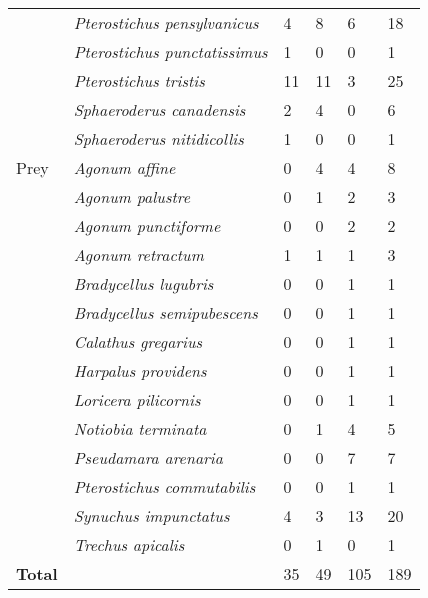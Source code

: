 \begin{table}[h]
\begin{tabular}{llllll}
                            & \textit{Pterostichus pensylvanicus}       & 4 & 8 & 6 & 18 \\
                            & \textit{Pterostichus punctatissimus}      & 1 & 0 & 0 & 1 \\
                            & \textit{Pterostichus tristis}             & 11 & 11 & 3 & 25 \\
                            & \textit{Sphaeroderus canadensis}          & 2 & 4 & 0 & 6 \\
                            & \textit{Sphaeroderus nitidicollis}        & 1 & 0 & 0 & 1 \\
                            \hline 
        Prey                & \textit{Agonum affine}                    & 0 & 4 & 4 & 8 \\ 
                            & \textit{Agonum palustre}                  & 0 & 1 & 2 & 3 \\
                            & \textit{Agonum punctiforme}               & 0 & 0 & 2 & 2 \\ 
                            & \textit{Agonum retractum}                 & 1 & 1 & 1 & 3 \\ 
                            & \textit{Bradycellus lugubris}             & 0 & 0 & 1 & 1 \\
                            & \textit{Bradycellus semipubescens}        & 0 & 0 & 1 & 1 \\
                            & \textit{Calathus gregarius}               & 0 & 0 & 1 & 1 \\
                            & \textit{Harpalus providens}               & 0 & 0 & 1 & 1 \\
                            & \textit{Loricera pilicornis}              & 0 & 0 & 1 & 1 \\
                            & \textit{Notiobia terminata}               & 0 & 1 & 4 & 5 \\
                            & \textit{Pseudamara arenaria}              & 0 & 0 & 7 & 7 \\
                            & \textit{Pterostichus commutabilis}        & 0 & 0 & 1 & 1 \\
                            & \textit{Synuchus impunctatus}             & 4 & 3 & 13 & 20 \\
                            & \textit{Trechus apicalis}                 & 0 & 1 & 0 & 1 \\
                            \hline 
        \textbf{Total}      &                                           & 35 & 49 & 105 & 189 \\
        \hline
    \end{tabular}
  \end{table}

